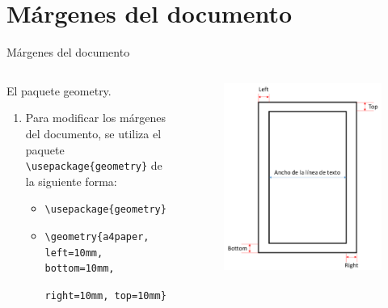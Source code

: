 \documentclass[aspectratio=169, 10pt]{beamer}
\begin{document}
\section{Márgenes del documento}
\begin{frame}[fragile]{Márgenes del documento}


\begin{columns}
    \begin{column}{.4\linewidth} 
\begin{exampleblock}{El paquete geometry.}
    \begin{enumerate}
    \item Para modificar los márgenes del documento, se utiliza el paquete \verb|\usepackage{geometry}| de la siguiente forma:
    \begin{itemize}
        \item \verb|\usepackage{geometry}|
        \item \verb|\geometry{a4paper,|
        \verb|left=10mm, bottom=10mm, |
        
        \verb|right=10mm, top=10mm}|
    \end{itemize}
\end{enumerate}
\end{exampleblock}
\end{column}

\begin{column}{.55\linewidth} 

\begin{figure}[H]
    \centering
    \includegraphics[scale=0.24]{imagenes/margenes.png} 
    \label{fig:enter-label}
\end{figure}



\end{column}
\end{columns}
\end{frame}
\end{document}

